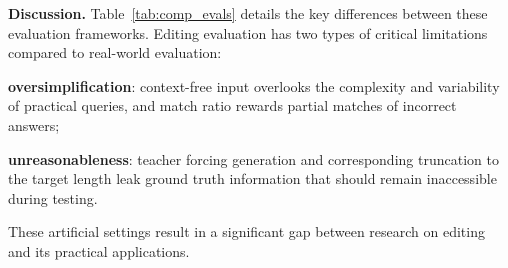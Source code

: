 

\textbf{Discussion.}
Table~\ref{tab:comp_evals} details the key differences between these evaluation frameworks. 
Editing evaluation has two types of critical limitations compared to real-world evaluation:
\begin{enumerate*}[label=\roman*)]
    \item \textbf{oversimplification}: context-free input overlooks the complexity and variability of practical queries, and match ratio rewards partial matches of incorrect answers;
    \item \textbf{unreasonableness}: teacher forcing generation and corresponding truncation to the target length leak ground truth information that should remain inaccessible during testing.
\end{enumerate*}
These artificial settings result in a significant gap between research on editing and its practical applications.








